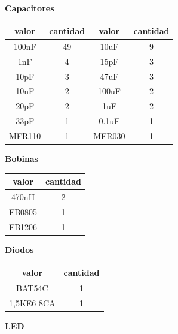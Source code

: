 \textbf{Capacitores}

\begin{center}
\begin{tabular}{|c|c|c|c|}
\hline
\hline
\normalsize valor & \normalsize cantidad & \normalsize valor & \normalsize cantidad\\
\hline
\normalsize 100nF & \normalsize 49 & \normalsize 10uF & \normalsize 9\\
\hline
\normalsize 1nF & \normalsize 4 & \normalsize 15pF & \normalsize 3\\
\hline
\normalsize 10pF & \normalsize 3 & \normalsize 47uF & \normalsize 3\\
\hline
\normalsize 10nF & \normalsize 2 & \normalsize 100uF & \normalsize 2\\
\hline
\normalsize 20pF & \normalsize 2 & \normalsize 1uF & \normalsize 2\\
\hline
\normalsize 33pF & \normalsize 1 & \normalsize 0.1uF & \normalsize 1\\
\hline
\normalsize MFR110 & \normalsize 1 & \normalsize MFR030 & \normalsize 1\\
\hline
\end{tabular}
\end{center}

\textbf{Bobinas}

\begin{center}
\begin{tabular}{|c|c|}
\hline
\hline
\normalsize valor & \normalsize cantidad\\
\hline
\normalsize 470nH & \normalsize 2\\
\hline
\normalsize FB0805 & \normalsize 1\\
\hline
\normalsize FB1206 & \normalsize 1\\
\hline
\end{tabular}
\end{center}

\textbf{Diodos}

\begin{center}
\begin{tabular}{|c|c|}
\hline
\hline
\normalsize valor & \normalsize cantidad\\
\hline
\normalsize BAT54C & \normalsize 1\\
\hline
\normalsize 1,5KE6 8CA & \normalsize 1\\
\hline
\end{tabular}
\end{center}

\textbf{LED}

